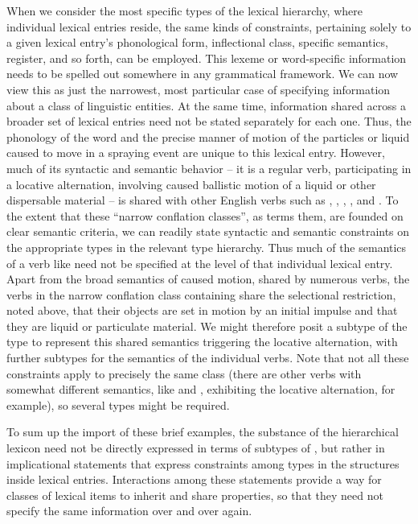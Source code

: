 \documentclass[output=paper
                ,modfonts
                ,nonflat
	        ,collection
	        ,collectionchapter
	        ,collectiontoclongg
 	        ,biblatex
                ,babelshorthands
                ,newtxmath
                ,draftmode
                ,colorlinks, citecolor=brown
]{./langsci/langscibook}
\begin{document}
{When we consider the most specific types of the lexical hierarchy, where individual lexical entries reside, the same kinds of constraints, pertaining solely to a given lexical entry's phonological form, inflectional class, specific semantics, register, and so forth, can be employed.
This lexeme or word-specific information needs to be spelled out somewhere in any grammatical framework.
We can now view this as just the narrowest, most particular case of specifying information about a class of linguistic entities.
At the same time, information shared across a broader set of lexical entries need not be stated separately for each one. 
Thus, the phonology of the word  and the precise manner of motion of the particles or liquid caused to move in a spraying event are unique to this lexical entry.
However, much of its syntactic and semantic behavior -- it is a regular verb,  participating in a locative alternation, involving caused ballistic motion of a liquid or other dispersable material -- is shared with other English verbs such as , , , , and .
To the extent that these ``narrow conflation classes'', as \citet{Pinker1989} terms them, are founded on clear semantic criteria, we can readily state syntactic and semantic constraints on the appropriate types in the relevant type hierarchy.
Thus much of the semantics of a verb like  need not be specified at the level of that individual lexical entry.
Apart from the broad semantics of caused motion, shared by numerous verbs, the verbs in the narrow conflation class containing  share the selectional restriction, noted above, that their objects are set in motion by an initial impulse and that they are liquid or particulate material.
We might therefore posit a subtype of the type  to represent this shared semantics triggering the locative alternation, with further subtypes for the semantics of the individual verbs.
Note that not all these constraints apply to precisely the same class (there are other verbs with somewhat different semantics, like  and , exhibiting the locative alternation, for example), so several types might be required.

To sum up the import of these brief examples, the substance of the hierarchical lexicon need not be directly expressed in terms of subtypes of , but rather in implicational statements that express constraints among types in the structures inside lexical entries.
Interactions among these statements provide a way for classes of lexical items to inherit and share properties, so that they need not specify the same information over and over again.

}
\end{document}
